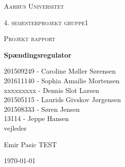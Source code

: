 \thispagestyle{empty}
	{\centering
	{\scshape\LARGE Aarhus Universitet \par}
	\vspace{1cm}
	{\scshape\Large 4. semesterprojekt gruppe1\par}
	{\scshape\Large Projekt rapport\par}
	\vspace{1.5cm}
	{\huge\bfseries Spændingsregulator\par}
	\vspace{2cm}
	{\Large
	201509249 - Caroline Møller Sørensen\\
	201611140 - Sophia Amailie Mortensen\\
	xxxxxxxxx - Dennis Slot Larsen \\
	201505115 - Laurids Givskov Jørgensen\\
	201508333 - Søren Jensen\\
	13114 - Jeppe Hansen\\   }
	\vfill
	vejleder\par
	Emir Pasic TEST

	\vfill

	{\large \today\par}
\par}

